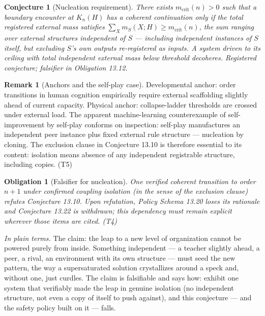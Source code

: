 \documentclass[11pt]{article}
\newtheorem{conjecture}{Conjecture}
\newtheorem{obligation}{Obligation}
\theoremstyle{definition}
\newtheorem{remark}{Remark}
\newcommand{\plainterms}{\emph{In plain terms.}}
\begin{document}
\begin{conjecture}[Nucleation requirement]
There exists $m_{\mathrm{crit}}(n) > 0$ such that a boundary encounter at $K_n(H)$ has a coherent continuation only if the total registered external mass satisfies $\sum_X m_S(X; H) \geq m_{\mathrm{crit}}(n)$, the sum ranging over external structures independent of $S$ --- including independent instances of $S$ itself, but excluding $S$'s own outputs re-registered as inputs. A system driven to its ceiling with total independent external mass below threshold decoheres. Registered conjecture; falsifier in Obligation 13.12.
\end{conjecture}

\begin{remark}[Anchors and the self-play case]
Developmental anchor: order transitions in human cognition empirically require external scaffolding slightly ahead of current capacity. Physical anchor: collapse-ladder thresholds are crossed under external load. The apparent machine-learning counterexample of self-improvement by self-play conforms on inspection: self-play manufactures an independent peer instance plus fixed external rule structure --- nucleation by cloning. The exclusion clause in Conjecture 13.10 is therefore essential to its content: isolation means absence of any independent registrable structure, including copies. (T5)
\end{remark}

\begin{obligation}[Falsifier for nucleation]
One verified coherent transition to order $n+1$ under confirmed coupling isolation (in the sense of the exclusion clause) refutes Conjecture 13.10. Upon refutation, Policy Schema 13.20 loses its rationale and Conjecture 13.22 is withdrawn; this dependency must remain explicit wherever those items are cited. (T4)
\end{obligation}

\noindent\plainterms{} The claim: the leap to a new level of organization cannot be powered purely from inside. Something independent --- a teacher slightly ahead, a peer, a rival, an environment with its own structure --- must seed the new pattern, the way a supersaturated solution crystallizes around a speck and, without one, just curdles. The claim is falsifiable and says how: exhibit one system that verifiably made the leap in genuine isolation (no independent structure, not even a copy of itself to push against), and this conjecture --- and the safety policy built on it --- falls.
\end{document}
